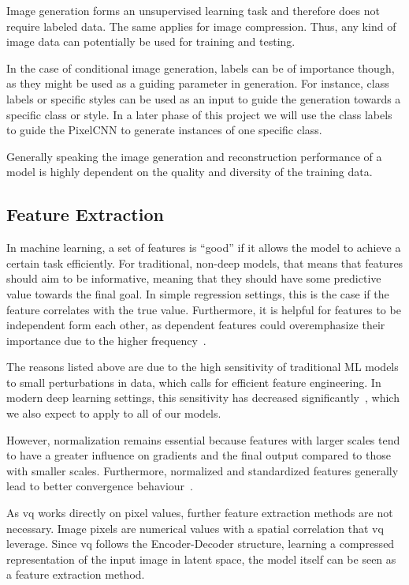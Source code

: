 Image generation forms an unsupervised learning task and therefore does not require labeled data.
The same applies for image compression.
Thus, any kind of image data can potentially be used for training and testing.

In the case of conditional image generation, labels can be of importance though, as they might be used as a guiding
parameter in generation.
For instance, class labels or specific styles  can be used as an input to guide the generation towards a specific class or style.
In a later phase of this project we will use the class labels to guide the PixelCNN to generate instances of one specific class.

Generally speaking the image generation and reconstruction performance of a model is highly dependent on the quality
and diversity of the training data.

\subsection{Feature Extraction}\label{subsec:feature-extraction}
In machine learning, a set of features is ``good'' if it allows the model to achieve a certain task
efficiently.
For traditional, non-deep models, that means that features should aim to be informative, meaning that
they should have some predictive value towards the final goal.
In simple regression settings, this is the case if the feature correlates with the true value.
Furthermore, it is helpful for features to be independent form each other, as dependent features could overemphasize
their importance due to the higher frequency~\cite{featengineer}.

The reasons listed above are due to the high sensitivity of traditional ML models to small perturbations in data,
which calls for efficient feature engineering.
In modern deep learning settings, this sensitivity has decreased significantly~\cite{lecun2015deep}, which we also
expect to apply to all of our models.

However, normalization remains essential because features with larger scales tend to have a greater influence on gradients and
the final output compared to those with smaller scales.
Furthermore, normalized and standardized features generally lead to better convergence behaviour~\cite{mueller}.

As \ac{vq} works directly on pixel values, further feature extraction methods are not necessary.
Image pixels are numerical values with a spatial correlation that \ac{vq} leverage.
Since \ac{vq} follows the Encoder-Decoder structure, learning a compressed representation of the input image in latent
space, the model itself can be seen as a feature extraction method.

